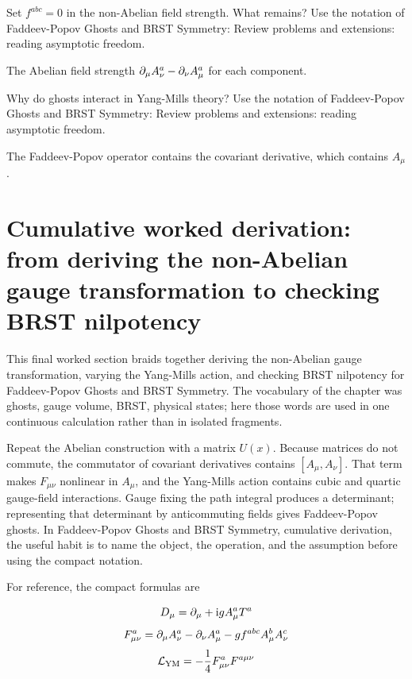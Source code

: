 \begin{exercise}
Set \(f^{abc}=0\) in the non-Abelian field strength.  What remains?  Use the notation of Faddeev-Popov Ghosts and BRST Symmetry: Review problems and extensions: reading asymptotic freedom.
\begin{answer}
The Abelian field strength \(\partial_\mu A_\nu^a-\partial_\nu A_\mu^a\) for each component.
\end{answer}
\end{exercise}

\begin{exercise}
Why do ghosts interact in Yang-Mills theory?  Use the notation of Faddeev-Popov Ghosts and BRST Symmetry: Review problems and extensions: reading asymptotic freedom.
\begin{answer}
The Faddeev-Popov operator contains the covariant derivative, which contains \(A_\mu\).
\end{answer}
\end{exercise}



\section{Cumulative worked derivation: from deriving the non-Abelian gauge transformation to checking BRST nilpotency}

This final worked section braids together deriving the non-Abelian gauge transformation, varying the Yang-Mills action, and checking BRST nilpotency for Faddeev-Popov Ghosts and BRST Symmetry.  The vocabulary of the chapter was ghosts, gauge volume, BRST, physical states; here those words are used in one continuous calculation rather than in isolated fragments.

Repeat the Abelian construction with a matrix \(U(x)\).  Because matrices do not commute, the commutator of covariant derivatives contains \([A_\mu,A_\nu]\).  That term makes \(F_{\mu\nu}\) nonlinear in \(A_\mu\), and the Yang-Mills action contains cubic and quartic gauge-field interactions.  Gauge fixing the path integral produces a determinant; representing that determinant by anticommuting fields gives Faddeev-Popov ghosts.  In Faddeev-Popov Ghosts and BRST Symmetry, cumulative derivation, the useful habit is to name the object, the operation, and the assumption before using the compact notation.

For reference, the compact formulas are

\[
  D_\mu=\partial_\mu+\mathrm i gA_\mu^aT^a
\]
\[
  F_{\mu\nu}^a=\partial_\mu A_\nu^a-\partial_\nu A_\mu^a-gf^{abc}A_\mu^bA_\nu^c
\]
\[
  \mathcal L_{\mathrm{YM}}=-\frac14F_{\mu\nu}^aF^{a\mu\nu}
\]

